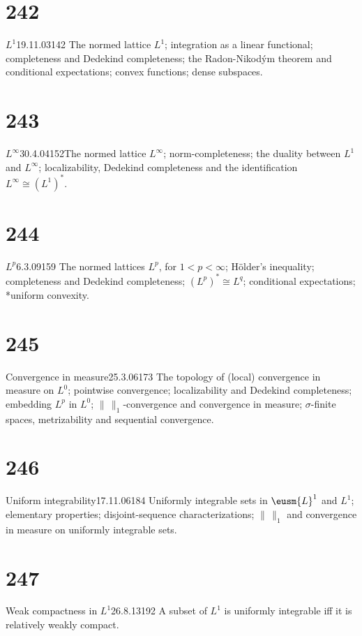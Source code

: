 \section{242}{$L^1$}{19.11.03}{142}{}
{The normed lattice $L^1$;  integration as a linear functional;
completeness and Dedekind completeness;  the Radon-Nikod\'ym theorem and
conditional expectations;  convex functions;  dense subspaces.}

\section{243}{$L^{\infty}$}{30.4.04}{152}{}{The normed lattice
$L^{\infty}$;  norm-completeness;  the duality
between $L^1$ and $L^{\infty}$;  localizability, Dedekind completeness
and the identification $L^{\infty}\cong(L^1)^*$.}

\section{244}{$L^p$}{6.3.09}{159}{}
{The normed lattices $L^p$, for $1<p<\infty$;  H\"older's
inequality;  completeness and Dedekind completeness;
$(L^p)^*\cong{L^q}$;  conditional expectations;  *uniform convexity.}

\section{245}{Convergence in measure}{25.3.06}{173}{}
{The topology of (local) convergence in measure on $L^0$;
pointwise convergence;  localizability and Dedekind completeness;
embedding $L^p$ in $L^0$;  $\|\,\|_1$-\vthsp{}convergence and
convergence in
measure;  $\sigma$-finite spaces, metrizability and sequential
convergence.}

\section{246}{Uniform integrability}{17.11.06}{184}{}
{Uniformly integrable sets in $\eusm{L}^1$ and $L^1$;  elementary
properties;  disjoint-sequence characterizations;  $\|\,\|_1$ and
convergence in measure on uniformly integrable sets.}

\section{247}{Weak compactness in $L^1$}{26.8.13}{192}{}
{A subset of $L^1$ is uniformly integrable iff it is relatively weakly
compact.}

